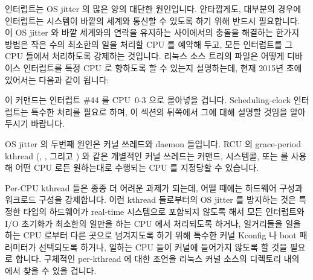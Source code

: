 인터럽트는 OS jitter 의 많은 양의 대단한 원인입니다.
안타깝게도, 대부분의 경우에 인터럽트는 시스템이 바깥의 세계와 통신할 수 있도록
하기 위해 반드시 필요합니다.
이 OS jitter 와 바깥 세계와의 연락을 유지하는 사이에서의 충돌을 해결하는 한가지
방법은 작은 수의 최소한의 일을 처리할 CPU 를 예약해 두고, 모든 인터럽트를 그
CPU 들에서 처리하도록 강제하는 것입니다.
리눅스 소스 트리의  파일은 어떻게 디바이스
인터럽트를 특정 CPU 로 향하도록 할 수 있는지 설명하는데, 현재 2015년 초에
있어서는 다음과 같이 됩니다:

\begin{quote}
	\scriptsize
\end{quote}

이 커맨드는 인터럽트 \#44 를 CPU~0-3 으로 몰아넣을 겁니다.
Scheduling-clock 인터럽트는 특수한 처리를 필요로 하며, 이 섹션의 뒤쪽에서 그에
대해 설명할 것임을 알아두시기 바랍니다.

OS jitter 의 두번째 원인은 커널 쓰레드와 daemon 들입니다.
RCU 의 grace-period kthread (, , 그리고
) 와 같은 개별적인 커널 쓰레드는  커맨드,
 시스템콜, 또는  를 사용해 어떤 CPU 로든
원하는대로 수행되는 CPU 를 지정당할 수 있습니다.

Per-CPU kthread 들은 종종 더 어려운 과제가 되는데, 어떨 때에는 하드웨어 구성과
워크로드 구성을 강제합니다.
이런 kthread 들로부터의 OS jitter 를 방지하는 것은 특정한 타입의 하드웨어가
real-time 시스템으로 포함되지 않도록 해서 모든 인터럽트와 I/O 초기화가 최소한의
일만을 하는 CPU 에서 처리되도록 하거나, 일거리들을 일을 하는 CPU 로부터 다른
곳으로 넘겨지도록 하기 위해 특수한 커널 Kconfig 나 boot 패러미터가 선택되도록
하거나, 일하는 CPU 들이 커널에 들어가지 않도록 할 것을 필요로 합니다.
구체적인 per-kthread 에 대한 조언을 리눅스 커널 소스의 
디렉토리 내의  에서 찾을 수 있을 겁니다.
\iffalse

